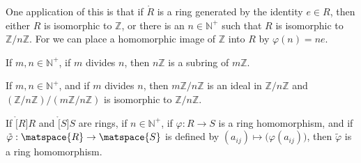             One application of this is that if $\ring{R}$ is a ring
            generated by the identity $e\in{R}$, then either $R$ is
            isomorphic to $\mathbb{Z}$, or there is an $n\in\mathbb{N}^{+}$
            such that $R$ is isomorphic to $\mathbb{Z}/n\mathbb{Z}$. For we
            can place a homomorphic image of $\mathbb{Z}$ into $R$ by
            $\varphi(n)=ne$.
            \begin{theorem}
                If $m,n\in\mathbb{N}^{+}$, if $m$ divides $n$, then
                $n\mathbb{Z}$ is a subring of $m\mathbb{Z}$.
            \end{theorem}
            \begin{theorem}
                If $m,n\in\mathbb{N}^{+}$, and if $m$ divides $n$, then
                $m\mathbb{Z}/n\mathbb{Z}$ is an ideal in
                $\mathbb{Z}/n\mathbb{Z}$ and
                $(\mathbb{Z}/n\mathbb{Z})/(m\mathbb{Z}/n\mathbb{Z})$ is
                isomorphic to $\mathbb{Z}/n\mathbb{Z}$.
            \end{theorem}
            \begin{theorem}
                If $\ring[R]{R}$ and $\ring[S]{S}$ are rings, if
                $n\in\mathbb{N}^{+}$, if $\varphi:R\rightarrow{S}$ is a
                ring homomorphism, and if
                $\tilde{\varphi}:\matspace{R}\rightarrow\matspace{S}$ is
                defined by $(a_{ij})\mapsto\big(\varphi(a_{ij})\big)$,
                then $\tilde{\varphi}$ is a ring homomorphism.
            \end{theorem}
